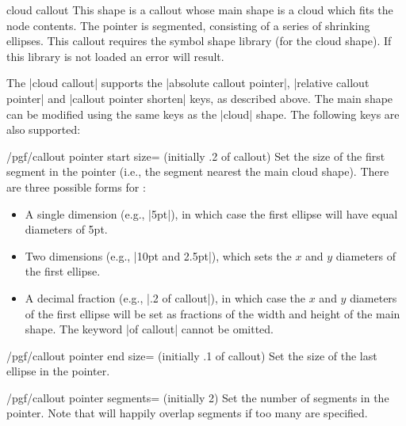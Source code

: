 \begin{shape}{cloud callout}
This shape is a callout whose main shape is a cloud which fits the
node contents. The pointer is segmented, consisting of a series of
shrinking ellipses. This callout requires the symbol shape library
(for the cloud shape). If this library is not loaded an error will
result.

\begin{codeexample}[]
\end{codeexample}

The |cloud callout| supports the |absolute callout pointer|,
|relative callout pointer| and |callout pointer shorten| keys, as
described above.
The main shape can be modified using the same keys as the |cloud|
shape. The following keys are also supported:

\begin{key}{/pgf/callout pointer start size= (initially .2 of callout)}
	Set the size of the first segment in the pointer (i.e., the segment
	nearest the main cloud shape). There are three possible forms for
	:
	\begin{itemize}
		\item
			A single dimension (e.g., |5pt|), in which case the first ellipse
			will have equal diameters of 5pt.
		\item
			Two dimensions (e.g., |10pt and 2.5pt|), which sets the $x$ and
			$y$ diameters of the first ellipse.
		\item
			A decimal fraction (e.g., |.2 of callout|), in which case
			the $x$ and $y$ diameters of the first ellipse will be set as
			fractions of the width and height of the main shape. The keyword
			|of callout| cannot be omitted.	
	\end{itemize}
\end{key}

\begin{key}{/pgf/callout pointer end size= (initially .1 of callout)}
	Set the size of the last ellipse in the pointer.
\end{key}

\begin{key}{/pgf/callout pointer segments= (initially 2)}
	Set the number of segments in the pointer. Note that \pgfname{} will
	happily	overlap segments if too many are specified.
\end{key}


\end{shape}
